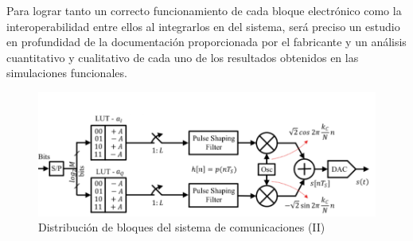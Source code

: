 \vspace{3mm}

Para lograr tanto un correcto funcionamiento de cada bloque electrónico como la interoperabilidad entre ellos al integrarlos en del sistema, será preciso un estudio en profundidad de la documentación proporcionada por el fabricante y un análisis cuantitativo y cualitativo de cada uno de los resultados obtenidos en las simulaciones funcionales. 

    \begin{figure}[h]
    	\centering
    	\includegraphics[width=1\textwidth]{img/diseno/sistema2.PNG}
    	\caption{Distribución de bloques del sistema de comunicaciones (II)}
    	\label{fig:sistema2}
    \end{figure}
    
\vspace{3mm}




